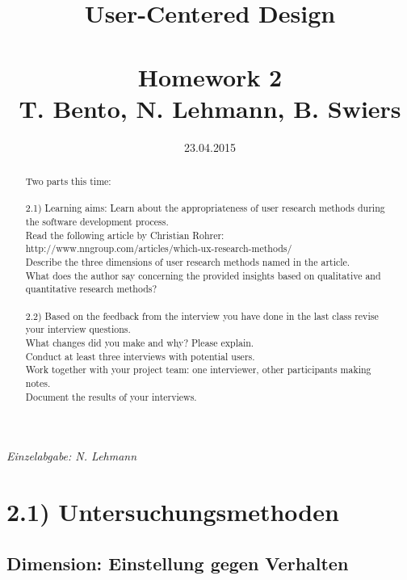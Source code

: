\documentclass{article}
\title{User-Centered Design\\~\\Homework 2\\ \small{T. Bento, N. Lehmann, B. Swiers}}
\date{23.04.2015}
\begin{document}
\renewcommand\abstractname{Assignment}
\maketitle


\begin{abstract}
Two parts this time:\\
\\
2.1) Learning aims: Learn about the appropriateness of user research methods during the software development process.\\
Read the following article by Christian Rohrer:\\
http://www.nngroup.com/articles/which-ux-research-methods/\\
Describe the three dimensions of user research methods named in the article.\\
What does the author say concerning the provided insights based on qualitative and quantitative research methods?\\
\\
2.2) Based on the feedback from the interview you have done in the last class revise your interview questions.\\
What changes did you make and why? Please explain.\\
Conduct at least three interviews with potential users.\\
Work together with your project team: one interviewer, other participants making notes.\\
Document the results of your interviews.
\end{abstract}

\newpage


\textit{Einzelabgabe: N. Lehmann}

\section*{2.1) Untersuchungsmethoden}

\subsection*{Dimension: Einstellung gegen Verhalten}
\end{document}
